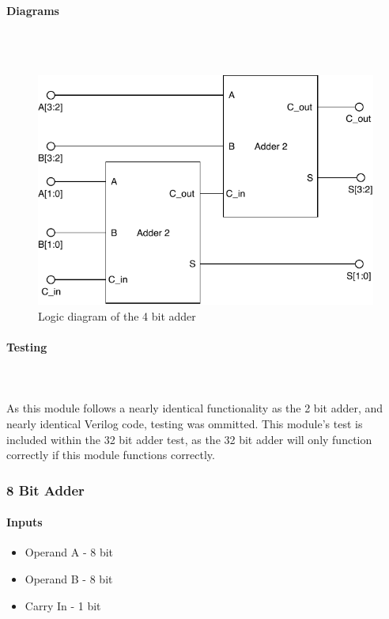 \documentclass{article}
\begin{document}
    \paragraph{Diagrams}
    \hfill\\\\
    \begin{figure}[H]
        \centering
        \includegraphics{../diagrams/alu/adder/adder_4.pdf}
        \caption{Logic diagram of the 4 bit adder}
    \end{figure}

    \paragraph{Testing}
    \hfill\\\\
    As this module follows a nearly identical functionality as the 2
    bit adder, and nearly identical Verilog code, testing was ommitted.
    This module's test is included within the 32 bit adder test, as the
    32 bit adder will only function correctly if this module functions
    correctly.





    \subsubsection{8 Bit Adder}

    \paragraph{Inputs}
    \begin{itemize}
        \item Operand A - 8 bit
        \item Operand B - 8 bit
        \item Carry In - 1 bit
    \end{itemize}
\end{document}
